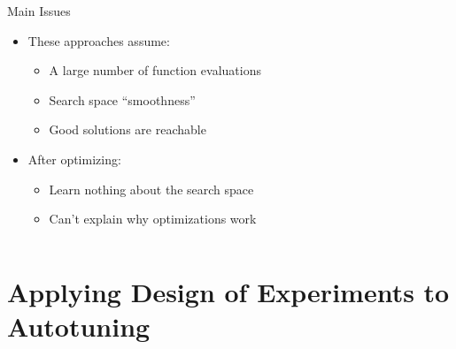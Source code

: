 \documentclass[10pt, compress, aspectratio=169, xcolor={table,usenames,dvipsnames}]{beamer}
\begin{document}
\begin{frame}
\begin{columns}[c]
            \begin{block}{Main Issues}
                \begin{itemize}
                    \item These approaches \alert{assume}:
                        \begin{itemize}
                            \item A \alert{large number of function evaluations}
                            \item Search space \alert{``smoothness''}
                            \item Good solutions are \alert{reachable}
                        \end{itemize}
                    \item After optimizing:
                        \begin{itemize}
                            \item \alert{Learn nothing} about the search space
                            \item \alert{Can't explain} why optimizations work
                        \end{itemize}
                \end{itemize}
            \end{block}

    \end{columns}
\end{frame}

\section{Applying Design of Experiments to Autotuning}
\end{document}

